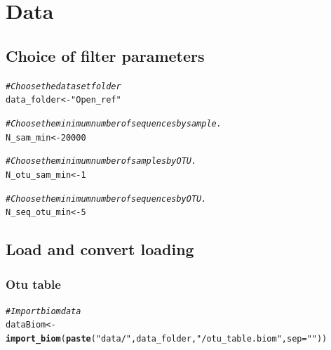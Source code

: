 \documentclass[12pt]{article}\usepackage[]{graphicx}\usepackage[]{color}
\makeatletter
\newcommand{\hlnum}[1]{\textcolor[rgb]{0.686,0.059,0.569}{#1}}%
\newcommand{\hlstr}[1]{\textcolor[rgb]{0.192,0.494,0.8}{#1}}%
\newcommand{\hlcom}[1]{\textcolor[rgb]{0.678,0.584,0.686}{\textit{#1}}}%
\newcommand{\hlstd}[1]{\textcolor[rgb]{0.345,0.345,0.345}{#1}}%
\newcommand{\hlkwb}[1]{\textcolor[rgb]{0.69,0.353,0.396}{#1}}%
\newcommand{\hlkwc}[1]{\textcolor[rgb]{0.333,0.667,0.333}{#1}}%
\newcommand{\hlkwd}[1]{\textcolor[rgb]{0.737,0.353,0.396}{\textbf{#1}}}%
\newenvironment{kframe}{%
 \def\at@end@of@kframe{}%
 \ifinner\ifhmode%
  \def\at@end@of@kframe{\end{minipage}}%
  \begin{minipage}{\columnwidth}%
 \fi\fi%
 \def\FrameCommand##1{\hskip\@totalleftmargin \hskip-\fboxsep
 \colorbox{shadecolor}{##1}\hskip-\fboxsep
     \hskip-\linewidth \hskip-\@totalleftmargin \hskip\columnwidth}%
 \MakeFramed {\advance\hsize-\width
   \@totalleftmargin\z@ \linewidth\hsize
   \@setminipage}}%
 {\par\unskip\endMakeFramed%
 \at@end@of@kframe}
\newenvironment{knitrout}{}{} %
\numberwithin{figure}{section}
\makeatother
\begin{document}
\section{Data}

  \subsection{Choice of filter parameters}
  \label{section:filter}
\begin{knitrout}\small
{}\color{fgcolor}\begin{kframe}
\begin{alltt}
\hlcom{#Choose the dataset folder}
\hlstd{data_folder} \hlkwb{<-} \hlstr{"Open_ref"}

\hlcom{#Choose the minimum number of sequences by sample.}
\hlstd{N_sam_min} \hlkwb{<-} \hlnum{20000}

\hlcom{#Choose the minimum number of samples by OTU.}
\hlstd{N_otu_sam_min} \hlkwb{<-} \hlnum{1}

\hlcom{#Choose the minimum number of sequences by OTU.}
\hlstd{N_seq_otu_min} \hlkwb{<-} \hlnum{5}
\end{alltt}
\end{kframe}
\end{knitrout}


  \subsection{Load and convert loading}
  \subsubsection{Otu table}
\begin{knitrout}\small
{}\color{fgcolor}\begin{kframe}
\begin{alltt}
\hlcom{#Import biom data}
\hlstd{dataBiom}   \hlkwb{<-} \hlkwd{import_biom}\hlstd{(}\hlkwd{paste}\hlstd{(}\hlstr{"data/"}\hlstd{, data_folder,} \hlstr{"/otu_table.biom"}\hlstd{,} \hlkwc{sep}\hlstd{=}\hlstr{""}\hlstd{))}
\end{alltt}
\end{kframe}
\end{knitrout}
\end{document}
